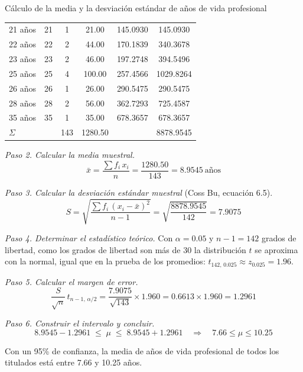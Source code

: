 \begin{mitabla}{Cálculo de la media y la desviación estándar de años de vida profesional}
\begin{tabular}{lccccc}
21 años & 21 & 1 & 21.00 & 145.0930 & 145.0930 \\
22 años & 22 & 2 & 44.00 & 170.1839 & 340.3678 \\
23 años & 23 & 2 & 46.00 & 197.2748 & 394.5496 \\
25 años & 25 & 4 & 100.00 & 257.4566 & 1029.8264 \\
26 años & 26 & 1 & 26.00 & 290.5475 & 290.5475 \\
28 años & 28 & 2 & 56.00 & 362.7293 & 725.4587 \\
35 años & 35 & 1 & 35.00 & 678.3657 & 678.3657 \\
\midrule
$\Sigma$ & & 143 & 1280.50 & & 8878.9545 \\
\bottomrule
\end{tabular}
\end{mitabla}

\textit{Paso 2. Calcular la media muestral.}
\[
\bar{x} = \frac{\sum f_i\,x_i}{n} = \frac{1280.50}{143} = 8.9545\ \text{años}
\]

\textit{Paso 3. Calcular la desviación estándar muestral} (Coss Bu, ecuación 6.5).
\[
S = \sqrt{\frac{\sum f_i\,(x_i-\bar{x})^2}{n-1}} = \sqrt{\frac{8878.9545}{142}} = 7.9075
\]

\textit{Paso 4. Determinar el estadístico teórico.} Con $\alpha = 0.05$ y $n-1 = 142$ grados de libertad, como los grados de libertad son más de 30 la distribución $t$ se aproxima con la normal, igual que en la prueba de los promedios: $t_{142,\,0.025} \approx z_{0.025} = 1.96$.

\textit{Paso 5. Calcular el margen de error.}
\[
\frac{S}{\sqrt{n}}\,t_{n-1,\,\alpha/2} = \frac{7.9075}{\sqrt{143}}\times 1.960 = 0.6613 \times 1.960 = 1.2961
\]

\textit{Paso 6. Construir el intervalo y concluir.}
\[
8.9545 - 1.2961 \;\le\; \mu \;\le\; 8.9545 + 1.2961 \quad\Longrightarrow\quad 7.66 \le \mu \le 10.25
\]

Con un 95\% de confianza, la media de años de vida profesional de todos los titulados está entre 7.66 y 10.25 años.

